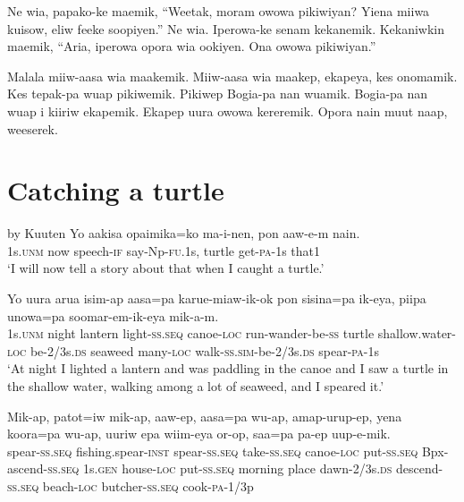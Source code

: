 Ne  wia,  papako-ke  maemik,  “Weetak,  moram  owowa  pikiwiyan? 
Yiena  miiwa  kuisow,  eliw  feeke  soopiyen.” 
Ne  wia.  Iperowa-ke  senam  kekanemik. 
Kekaniwkin  maemik,  “Aria,  iperowa  opora  wia  ookiyen. 
Ona  owowa  pikiwiyan.”

Malala  miiw-aasa  wia  maakemik. 
Miiw-aasa  wia  maakep,  ekapeya,  kes onomamik. 
Kes  tepak-pa  wuap  pikiwemik. 
Pikiwep  Bogia-pa  nan  wuamik. 
Bogia-pa  nan  wuap  i  kiiriw  ekapemik. 
Ekapep  uura  owowa  kereremik. 
Opora  nain  muut  naap,  weeserek. 


\section{Catching a turtle}\label{app:2:turtle}
by Kuuten  
\ea
\gll  Yo  aakisa  opaimika=ko  ma-i-nen,  pon  aaw-e-m  nain. \\
1s.\textsc{unm}  now  speech-\textsc{if}  say-Np-\textsc{fu}.1s,  turtle  get-\textsc{pa}-1s  that1 \\
\glt ‘I will now tell a story about that when I caught a turtle.’ \\
\z


\ea
\gll  Yo  uura  arua  isim-ap  aasa=pa  karue-miaw-ik-ok           pon  sisina=pa  ik-eya,  piipa  unowa=pa               soomar-em-ik-eya  mik-a-m. \\
1s.\textsc{unm}  night  lantern  light-\textsc{ss.seq}  canoe-\textsc{loc}  run-wander-be-\textsc{ss}  turtle  shallow.water-\textsc{loc}  be-2/3s.\textsc{ds}  seaweed  many-\textsc{loc} walk-\textsc{ss}.\textsc{sim}-be-2/3s.\textsc{ds}  spear-\textsc{pa}-1s \\




\glt ‘At night I lighted a lantern and was paddling in the canoe and I saw a turtle in the shallow water, walking among a lot of seaweed, and I speared it.’ \\
\z


\ea
\gll  Mik-ap,  patot=iw  mik-ap,  aaw-ep,                    aasa=pa  wu-ap,  amap-urup-ep,  yena  koora=pa             wu-ap,  uuriw  epa  wiim-eya  or-op,  saa=pa  pa-ep  uup-e-mik. \\
 spear-\textsc{ss.seq}  fishing.spear-\textsc{inst}  spear-\textsc{ss.seq}  take-\textsc{ss.seq}  canoe-\textsc{loc}  put-\textsc{ss.seq}  Bpx-ascend-\textsc{ss.seq}  1s.\textsc{gen}  house-\textsc{loc}  put-\textsc{ss.seq}  morning  place  dawn-2/3s.\textsc{ds}  descend-\textsc{ss.seq}   beach-\textsc{loc}  butcher{}-\textsc{ss.seq}  cook-\textsc{pa}-1/3p \\






